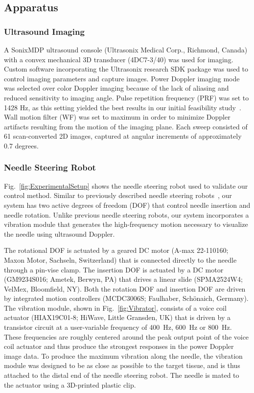 \subsection{Apparatus}
\subsubsection{Ultrasound Imaging}
A SonixMDP ultrasound console (Ultrasonix Medical Corp., Richmond, Canada) with a convex mechanical 3D transducer (4DC7-3/40) was used for imaging. Custom software incorporating the Ultrasonix research SDK package was used to control imaging parameters and capture images. Power Doppler imaging mode was selected over color Doppler imaging because of the lack of aliasing and reduced sensitivity to imaging angle. Pulse repetition frequency (PRF) was set to 1428 Hz, as this setting yielded the best results in our initial feasibility study~\cite{Adebar2013}. Wall motion filter (WF) was set to maximum in order to minimize Doppler artifacts resulting from the motion of the imaging plane. Each sweep consisted of 61 scan-converted 2D images, captured at angular increments of approximately 0.7 degrees.
\subsubsection{Needle Steering Robot}
Fig.~\ref{fig:ExperimentalSetup} shows the needle steering robot used to validate our control method. Similar to previously described needle steering robots~\cite{Webster2005}, our system has two active degrees of freedom (DOF) that control needle insertion and needle rotation. Unlike previous needle steering robots, our system incorporates a vibration module that generates the high-frequency motion necessary to visualize the needle using ultrasound Doppler.

The rotational DOF is actuated by a geared DC motor (A-max 22-110160; Maxon Motor, Sachseln, Switzerland) that is connected directly to the needle through a pin-vise clamp. The insertion DOF is actuated by a DC motor (GM9234S016; Ametek, Berwyn, PA) that drives a linear slide (SPMA2524W4; VelMex, Bloomfield, NY). Both the rotation DOF and insertion DOF are driven by integrated motion controllers (MCDC3006S; Faulhaber, Schönaich, Germany). The vibration module, shown in Fig.~\ref{fig:Vibrator}, consists of a voice coil actuator (HIAX19C01-8; HiWave, Little Gransden, UK) that is driven by a transistor circuit at a user-variable frequency of 400~Hz, 600~Hz or 800~Hz. These frequencies are roughly centered around the peak output point of the voice coil actuator and thus produce the strongest responses in the power Doppler image data. To produce the maximum vibration along the needle, the vibration module was designed to be as close as possible to the target tissue, and is thus attached to the distal end of the needle steering robot. The needle is mated to the actuator using a 3D-printed plastic clip.


